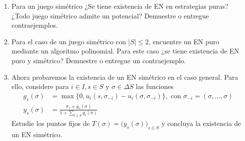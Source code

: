 \documentclass[11pt, spanish]{article}
\theoremstyle{plain}
\begin{document}
\begin{itemize}
  \begin{enumerate}
    \item Para un juego sim\'etrico ¿Se tiene existencia de EN en
      estrategias puras? ¿Todo juego sim\'etrico admite un potencial?
      Demuestre o entregue contraejemplos.
    \item Para el caso de un juego sim\'etrico con $|S|\leq 2$,
      encuentre un EN puro mediante un algoritmo polinomial. Para
      este caso ¿se tiene existencia de EN puro y sim\'etrico?
      Demuestre o entregue un contraejemplo.
    \item Ahora probaremos la existencia de un EN sim\'etrico en
      el caso general. Para ello, considere para $i\in I, s\in S$ y
      $\sigma \in \Delta S$ las funciones
      \begin{align*}
	g_s(\sigma) & =  \max \big\{0, u_i(s,\sigma_{-i}) -  u_i(\sigma, \sigma_{-i})\big\}, \text{ con } \sigma_{-i}=(\sigma,\dots,\sigma)\\
	y_s(\sigma) & = \frac{\sigma_s+g_s(\sigma)}{1+ \sum_{t\in S} g_t(\sigma)}
      \end{align*}
      Estudie los puntos fijos de $T(\sigma)= \big( y_s(\sigma)\big)_{s\in S}$ y concluya la existencia de
      un EN sim\'etrico.
  \end{enumerate}
  

\end{itemize}
\end{document}
